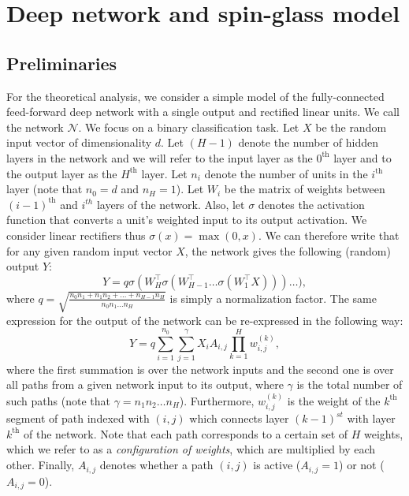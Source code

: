 \documentclass[twoside]{article}
\begin{document}
\section{Deep network and spin-glass model}
\label{sec:NNSG}

\subsection{Preliminaries}

For the theoretical analysis, we consider a simple model of the fully-connected feed-forward deep network with a single output and rectified linear units. We call the network $\mathcal{N}$. We focus on a binary classification task. Let $X$ be the random input vector of dimensionality $d$. Let $(H-1)$ denote the number of hidden layers in the network and we will refer to the input layer as the $0^{\text{th}}$ layer and to the output layer as the $H^{\text{th}}$ layer. Let $n_i$ denote the number of units in the $i^{\text{th}}$ layer (note that $n_0 = d$ and $n_H = 1$). Let $W_i$ be the matrix of weights between $(i - 1)^{\text{th}}$ and $i^{th}$ layers of the network. Also, let $\sigma$ denotes the activation function that converts a unit's weighted input to its output activation. We consider linear rectifiers thus $\sigma(x) = \max(0,x)$. We can therefore write that for any given random input vector $X$, the network gives the following (random) output $Y$:
\[Y = q\sigma(W_H^{\top}\sigma(W_{H-1}^{\top}\dots\sigma(W_1^{\top}X)))\dots),
\]
where $q = \sqrt{\frac{n_0n_1 + n_1n_2 + ... + n_{H-1}n_H}{n_0n_1...n_H}}$ is simply a normalization factor. The same expression for the output of the network can be re-expressed in the following way:
\begin{equation}
Y = q\sum_{i=1}^{n_0}\sum_{j = 1}^\gamma X_{i}A_{i,j}\prod_{k = 1}^{H}w_{i,j}^{(k)},
\label{eq:befrein}
\end{equation}
where the first summation is over the network inputs and the second one is over all paths from a given network input to its output, where $\gamma$ is the total number of such paths (note that $\gamma = n_1n_2\dots n_H$). Furthermore, $w_{i,j}^{(k)}$ is the weight of the $k^{\text{th}}$ segment of path indexed with $(i,j)$ which connects layer $(k-1)^{st}$ with layer $k^{\text{th}}$ of the network. Note that each path corresponds to a certain set of $H$ weights, which we refer to as a \textit{configuration of weights}, which are multiplied by each other. Finally, $A_{i,j}$ denotes whether a path $(i,j)$ is active ($A_{i,j} = 1$) or not ($A_{i,j} = 0$). 
\end{document}
